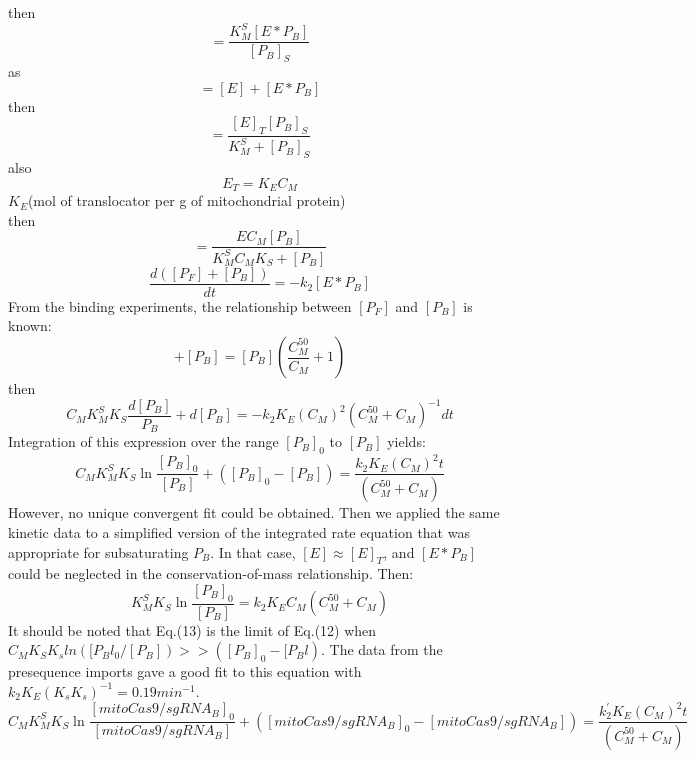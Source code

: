 \documentclass[UTF8]{ctexart}%
\begin{document}
then
\begin{equation}
[E]=\frac{K_M^S[E*P_B]}{[P_B]_S}
\end{equation}
as
\begin{equation}
[E_T]=[E]+[E*P_B]
\end{equation}
then
\begin{equation}
[E*P_B]=\frac{[E]_T[P_B]_S}{K_M^S+[P_B]_S}
\end{equation}
also
\begin{equation}
E_T=K_EC_M
\end{equation}
$K_E$(mol of translocator per g of mitochondrial protein) \\
then
\begin{equation}
[E*P_B]=\frac{EC_M[P_B]}{K_M^SC_MK_S+[P_B]}
\end{equation}
\begin{equation}
\frac{d([P_F]+[P_B])}{d t}=-k_2[E*P_B]
\end{equation}
From the binding experiments, the relationship between $[P_F]$ and $[P_B]$ is known:
\begin{equation}
[P_F]+[P_B]=[P_B](\frac{C_M^{50}}{C_M}+1)
\end{equation}
then
\begin{equation}
C_MK_M^SK_S \frac{d[P_B]}{P_B}+d[P_B]=-k_2K_E(C_M)^2(C_M^{50}+C_M)^{-1} d t
\end{equation}
Integration of this expression over the range $[P_B]_0$ to $[P_B]$ yields:
\begin{equation}
C_MK_M^SK_S\ln\frac{[P_B]_0}{[P_B]}+([P_B]_0-[P_B])=\frac{k_2K_E(C_M)^2 t}{(C_M^{50}+C_M)}
\end{equation}
However, no unique convergent fit could be obtained. Then we applied the same kinetic data to a simplified version of the integrated rate equation that was appropriate for subsaturating $P_B$. In that case,  $[E] \approx [E]_T$, and $[E*P_B]$ could be neglected in the conservation-of-mass relationship. Then:
\begin{equation}
K_M^SK_S\ln\frac{[P_B]_0}{[P_B]}=k_2K_EC_M (C_M^{50}+C_M)
\end{equation}
It should be noted that Eq.(13) is the limit of Eq.(12) when $C_MK_S K_sln([P_Bl_0/[P_B]) >> ([P_B]_0 - [P_Bl)$. The data from the presequence imports gave a good fit to this equation with $k_2K_E(K_s K_s)^{-1} = 0.19 min^{-1}$.
	\begin{displaymath}
	C_MK_M^SK_S\ln\frac{[mitoCas9/sgRNA_B]_0}{[mitoCas9/sgRNA_B]}+([mitoCas9/sgRNA_B]_0-[mitoCas9/sgRNA_B])=\frac {k_2^{'}K_E(C_M)^2 t}{(C_M^{50}+C_M)}
	\end{displaymath}
\end{document}

